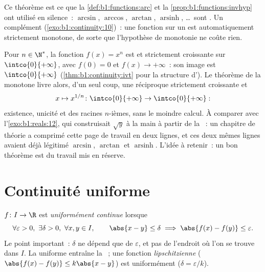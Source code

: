 \begin{remark}
Ce théorème est ce que la \cref{def:b1:functions:arc} et la
\cref{prop:b1:functions:invhyp} ont utilisé en silence~: $\arcsin$,
$\arccos$, $\arctan$, $\operatorname{arsinh}$, \dots\ sont .
Un complément (\cref{exo:b1:continuity:10})~: une fonction 
\emph{} sur un  est automatiquement strictement
monotone, de sorte que l'hypothèse de monotonie ne coûte rien.
\end{remark}

\begin{example}\label{ex:b1:continuity:nthroot}
Pour $n \in \N^*$, la fonction $f(x) = x^n$ est  et
strictement croissante sur $\intco{0}{+\infty}$, avec $f(0) = 0$
et $f(x) \to +\infty$~: son image est $\intco{0}{+\infty}$
(\cref{thm:b1:continuity:ivt} pour la structure d'). Le
théorème de la  monotone livre alors, d'un seul coup,
une réciproque strictement croissante et \emph{}
\[
x \mapsto x^{1/n} \colon \intco{0}{+\infty} \to
\intco{0}{+\infty} :
\]
existence, unicité et  des racines $n$-ièmes, sans
le moindre calcul. À comparer avec l'\cref{exo:b1:reals:12}, qui
construisait $\sqrt y$ à la main à partir de la ~: un chapitre de théorie a comprimé cette page de
travail en deux lignes, et ces deux mêmes lignes avaient déjà
légitimé $\arcsin$, $\arctan$ et $\operatorname{arsinh}$. L'idée
à retenir~: un bon théorème est du travail mis en réserve.
\end{example}

\section{Continuité uniforme}

\begin{definition}\label{def:b1:continuity:uniform}
$f \colon I \to \R$ est \emph{uniformément
continue} lorsque
\[
\forall \varepsilon > 0,\ \exists \delta > 0,\ \forall x, y \in I,
\qquad \abs{x - y} \leq \delta \implies \abs{f(x) - f(y)} \leq
\varepsilon .
\]
Le point important~: $\delta$ ne dépend que de $\varepsilon$, et pas
de l'endroit où l'on se trouve dans $I$. La  uniforme
entraîne la ~; une fonction \emph{lipschitzienne}
($\abs{f(x) - f(y)} \leq k \abs{x - y}$) est uniformément 
($\delta = \varepsilon/k$).
\end{definition}

